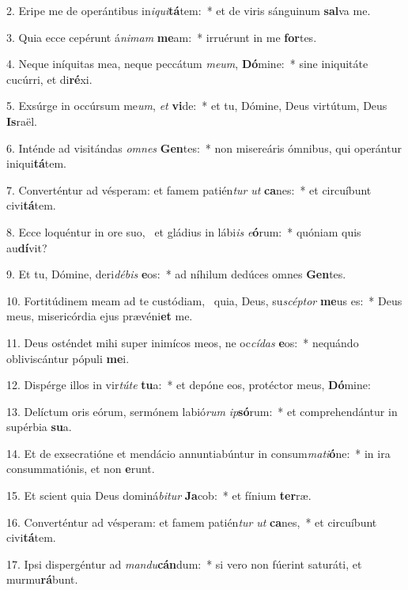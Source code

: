 2. Eripe me de operántibus in\textit{i}\textit{qui}\textbf{tá}tem:~*  et de viris sánguinum \textbf{sal}va me.\

3. Quia ecce cepérunt á\textit{ni}\textit{mam} \textbf{me}am:~*  irruérunt in me \textbf{for}tes.\

4. Neque iníquitas mea, neque peccátum \textit{me}\textit{um}, \textbf{Dó}mine:~*  sine iniquitáte cucúrri, et di\textbf{ré}xi.\

5. Exsúrge in occúrsum me\textit{um}, \textit{et} \textbf{vi}de:~*  et tu, Dómine, Deus virtútum, Deus \textbf{Is}raël.\

6. Inténde ad visitándas \textit{om}\textit{nes} \textbf{Gen}tes:~*  non misereáris ómnibus, qui operántur iniqui\textbf{tá}tem.\

7. Converténtur ad vésperam: et famem patién\textit{tur} \textit{ut} \textbf{ca}nes:~*  et circuíbunt civi\textbf{tá}tem.\

8. Ecce loquéntur in ore suo, \dag\  et gládius in lábi\textit{is} \textit{e}\textbf{ó}rum:~*  quóniam quis au\textbf{dí}vit?\

9. Et tu, Dómine, deri\textit{dé}\textit{bis} \textbf{e}os:~*  ad níhilum dedúces omnes \textbf{Gen}tes.\

10. Fortitúdinem meam ad te custódiam, \dag\  quia, Deus, su\textit{scép}\textit{tor} \textbf{me}us es:~*  Deus meus, misericórdia ejus prævéni\textbf{et} me.\

11. Deus osténdet mihi super inimícos meos, ne oc\textit{cí}\textit{das} \textbf{e}os:~*  nequándo obliviscántur pópuli \textbf{me}i.\

12. Dispérge illos in vir\textit{tú}\textit{te} \textbf{tu}a:~*  et depóne eos, protéctor meus, \textbf{Dó}mine:\

13. Delíctum oris eórum, sermónem labió\textit{rum} \textit{ip}\textbf{só}rum:~*  et comprehendántur in supérbia \textbf{su}a.\

14. Et de exsecratióne et mendácio annuntiabúntur in consum\textit{ma}\textit{ti}\textbf{ó}ne:~*  in ira consummatiónis, et non \textbf{e}runt.\

15. Et scient quia Deus dominá\textit{bi}\textit{tur} \textbf{Ja}cob:~*  et fínium \textbf{ter}ræ.\

16. Converténtur ad vésperam: et famem patién\textit{tur} \textit{ut} \textbf{ca}nes,~*  et circuíbunt civi\textbf{tá}tem.\

17. Ipsi dispergéntur ad \textit{man}\textit{du}\textbf{cán}dum:~*  si vero non fúerint saturáti, et murmu\textbf{rá}bunt.\


